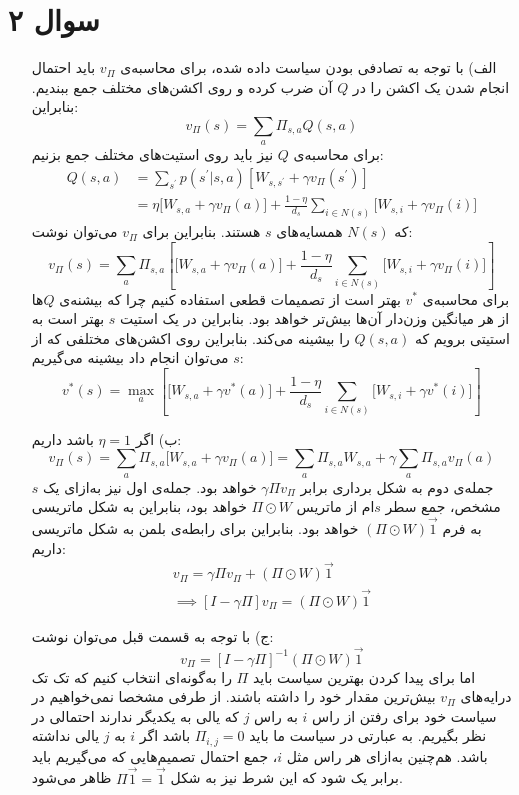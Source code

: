 \documentclass[a4paper, 12pt]{article}
\begin{document}
\section*{سوال ۲}
\begin{enumerate}
	\item[الف)]
	با توجه به تصادفی بودن سیاست داده شده، برای محاسبه‌ی $v_\Pi$ باید احتمال انجام شدن یک اکشن را در $Q$ آن ضرب کرده و روی اکشن‌های مختلف جمع ببندیم. بنابراین:
	\[
	v_\Pi(s) = \sum_{a} \Pi_{s,a} Q(s,a)
	\]
	برای محاسبه‌ی $Q$ نیز باید روی استیت‌های مختلف جمع بزنیم:
	\[
	\begin{aligned}
		Q(s, a) &= \sum_{s^\prime} p(s^\prime|s, a)\left[W_{s,s^\prime} + \gamma v_\Pi(s^\prime)\right] \\[0.4em]
		&= \eta \big[W_{s,a} + \gamma v_\Pi(a)\big] + \frac{1-\eta}{d_s}\sum_{i\in N(s)} \big[W_{s,i} + \gamma v_\Pi(i)\big]
	\end{aligned}
	\]
	که $N(s)$ همسایه‌های $s$ هستند. بنابراین برای $v_\Pi$ می‌توان نوشت:
	\[
	v_\Pi(s) = \sum_a \Pi_{s,a} \left[\big[W_{s,a} + \gamma v_\Pi(a)\big] + \frac{1-\eta}{d_s}\sum_{i\in N(s)} \big[W_{s,i} + \gamma v_\Pi(i)\big]\right]
	\]
	برای محاسبه‌ی $v^\ast$ بهتر است از تصمیمات قطعی استفاده کنیم چرا که بیشنه‌ی $Q$ها از هر میانگین وزن‌دار آن‌ها بیش‌تر خواهد بود. بنابراین در یک استیت $s$ بهتر است به استیتی برویم که $Q(s,a)$ را بیشینه می‌کند. بنابراین روی اکشن‌های مختلفی که از $s$ می‌توان انجام داد بیشینه می‌گیریم:
	\[
	v^\ast(s) = \max_a \left[\big[W_{s,a} + \gamma v^\ast(a)\big] + \frac{1-\eta}{d_s}\sum_{i\in N(s)} \big[W_{s,i} + \gamma v^\ast(i)\big]\right]
	\]
	\item[ب)]
	اگر $\eta = 1$ باشد داریم:
	\[
	v_\Pi(s) = \sum_{a} \Pi_{s,a}\big[W_{s,a} + \gamma v_\Pi(a)\big] = \sum_{a}  \Pi_{s,a} W_{s,a} + \gamma\sum_{a}\Pi_{s,a}v_\Pi(a)
	\]
	جمله‌ی دوم به شکل برداری برابر
	$\gamma \Pi v_\Pi$
	خواهد بود. جمله‌ی اول نیز به‌ازای یک $s$ مشخص، جمع سطر $s$ام از ماتریس
	$\Pi \odot W$
	خواهد بود، بنابراین به شکل ماتریسی به فرم 
	$(\Pi \odot W)\overrightarrow{1}$
	خواهد بود. بنابراین برای رابطه‌ی بلمن به شکل ماتریسی داریم:
	\[
	\begin{gathered}
		v_\Pi = \gamma \Pi v_\Pi + (\Pi \odot W)\overrightarrow{1} \\[0.4em]
		\implies \boxed{[I - \gamma \Pi]v_\Pi = (\Pi \odot W)\overrightarrow{1}}
	\end{gathered}
	\]
	\item[ج)]
	با توجه به قسمت قبل می‌توان نوشت:
	\[
	v_\Pi = [I - \gamma \Pi]^{-1}(\Pi \odot W)\overrightarrow{1}
	\]
	اما برای پیدا کردن بهترین سیاست باید $\Pi$ را به‌گونه‌ای انتخاب کنیم که تک تک درایه‌های $v_\Pi$ بیش‌ترین مقدار خود را داشته باشند. از طرفی مشخصا نمی‌خواهیم در سیاست خود برای رفتن از راس $i$ به راس $j$ که یالی به یکدیگر ندارند احتمالی در نظر بگیریم. به عبارتی در سیاست ما باید
	$\Pi_{i,j} = 0$
	باشد اگر $i$ به $j$ یالی نداشته باشد. هم‌چنین به‌ازای هر راس مثل $i$، جمع احتمال تصمیم‌هایی که می‌گیریم باید برابر یک شود که این شرط نیز به شکل
	$\Pi\overrightarrow{1} = \overrightarrow{1}$
	ظاهر می‌شود.
\end{enumerate}
\end{document}

